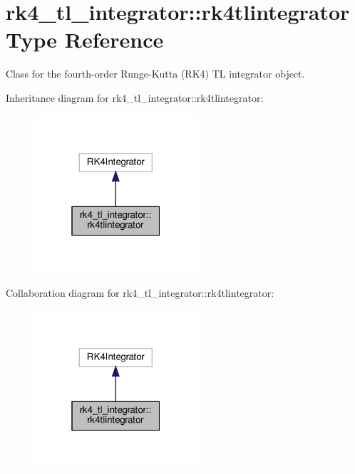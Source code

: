 \hypertarget{structrk4__tl__integrator_1_1rk4tlintegrator}{}\section{rk4\+\_\+tl\+\_\+integrator\+:\+:rk4tlintegrator Type Reference}
\label{structrk4__tl__integrator_1_1rk4tlintegrator}


Class for the fourth-\/order Runge-\/\+Kutta (R\+K4) TL integrator object.  




Inheritance diagram for rk4\+\_\+tl\+\_\+integrator\+:\+:rk4tlintegrator\+:\nopagebreak
\begin{figure}[H]
\begin{center}
\leavevmode
\includegraphics[width=172pt]{structrk4__tl__integrator_1_1rk4tlintegrator__inherit__graph}
\end{center}
\end{figure}


Collaboration diagram for rk4\+\_\+tl\+\_\+integrator\+:\+:rk4tlintegrator\+:\nopagebreak
\begin{figure}[H]
\begin{center}
\leavevmode
\includegraphics[width=172pt]{structrk4__tl__integrator_1_1rk4tlintegrator__coll__graph}
\end{center}
\end{figure}


